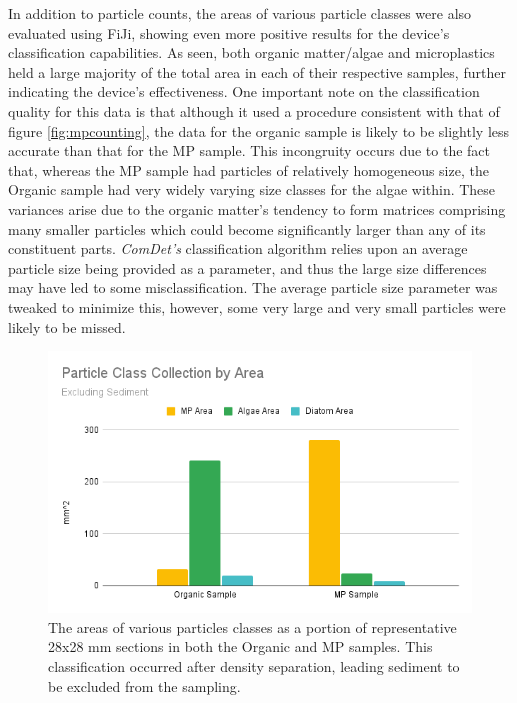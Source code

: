 \documentclass[fleqn,10pt]{SelfArx} %
\begin{document}
		In addition to particle counts, the areas of various particle classes were also evaluated using FiJi, showing even more positive results for the device's classification capabilities. As seen, both organic matter/algae and microplastics held a large majority of the total area in each of their respective samples, further indicating the device's effectiveness. One important note on the classification quality for this data is that although it used a procedure consistent with that of figure \ref{fig:mpcounting}, the data for the organic sample is likely to be slightly less accurate than that for the MP sample. This incongruity occurs due to the fact that, whereas the MP sample had particles of relatively homogeneous size, the Organic sample had very widely varying size classes for the algae within. These variances arise due to the organic matter's tendency to form matrices comprising many smaller particles which could become significantly larger than any of its constituent parts. \textit{ComDet's} classification algorithm relies upon an average particle size being provided as a parameter, and thus the large size differences may have led to some misclassification. The average particle size parameter was tweaked to minimize this, however, some very large and very small particles were likely to be missed. 
	
	\begin{figure}[h]
		\centering
		\includegraphics[width=1\linewidth]{Figures/PartClassArea}
		\caption[Collected Particle Areas]{The areas of various particles classes as a portion of representative 28x28 mm sections in both the Organic and MP samples. This classification occurred after density separation, leading sediment to be excluded from the sampling.}
		\label{fig:particleareas}
	\end{figure}
	
\end{document}
